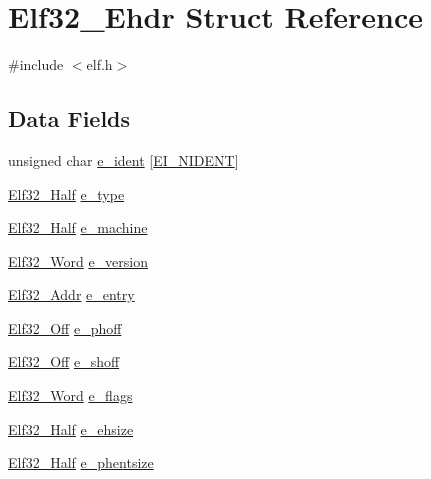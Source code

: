 \hypertarget{struct_elf32___ehdr}{\section{Elf32\-\_\-\-Ehdr Struct Reference}
\label{struct_elf32___ehdr}
}


{\ttfamily \#include $<$elf.\-h$>$}

\subsection*{Data Fields}
\begin{DoxyCompactItemize}
\item 
unsigned char \hyperlink{struct_elf32___ehdr_a989deb32d9be1514da87d64e8698600a}{e\-\_\-ident} \mbox{[}\hyperlink{elf_8h_ae407130db14180c6737390604ba7c1fe}{E\-I\-\_\-\-N\-I\-D\-E\-N\-T}\mbox{]}
\item 
\hyperlink{elf_8h_a2ff0787d7d1bae0f251192806a2974ca}{Elf32\-\_\-\-Half} \hyperlink{struct_elf32___ehdr_a7f0b549920bf4fc78b5ca36a17dc50b3}{e\-\_\-type}
\item 
\hyperlink{elf_8h_a2ff0787d7d1bae0f251192806a2974ca}{Elf32\-\_\-\-Half} \hyperlink{struct_elf32___ehdr_a334b2b2406970a5d2a0a903dd5ed5745}{e\-\_\-machine}
\item 
\hyperlink{elf_8h_af5924ece606c732e86f8263a19408e45}{Elf32\-\_\-\-Word} \hyperlink{struct_elf32___ehdr_af3c8fac8345400aef61da74b2de320c8}{e\-\_\-version}
\item 
\hyperlink{elf_8h_a40c6d4571e6001f443cc6a6474620158}{Elf32\-\_\-\-Addr} \hyperlink{struct_elf32___ehdr_a146e750d8c5ddfa36d84e83fd43a9828}{e\-\_\-entry}
\item 
\hyperlink{elf_8h_a655751f9b317369b93c581ea8ed84516}{Elf32\-\_\-\-Off} \hyperlink{struct_elf32___ehdr_ada87533ed3557b687daa8d999461c79b}{e\-\_\-phoff}
\item 
\hyperlink{elf_8h_a655751f9b317369b93c581ea8ed84516}{Elf32\-\_\-\-Off} \hyperlink{struct_elf32___ehdr_ad1cb2a7b39b5465b19922fcd2a449ee1}{e\-\_\-shoff}
\item 
\hyperlink{elf_8h_af5924ece606c732e86f8263a19408e45}{Elf32\-\_\-\-Word} \hyperlink{struct_elf32___ehdr_af4e9f6a9950c02e6378aa0e85aa8bfe3}{e\-\_\-flags}
\item 
\hyperlink{elf_8h_a2ff0787d7d1bae0f251192806a2974ca}{Elf32\-\_\-\-Half} \hyperlink{struct_elf32___ehdr_aa0fef16d9e9b4c56c6449fe6e5e43571}{e\-\_\-ehsize}
\item 
\hyperlink{elf_8h_a2ff0787d7d1bae0f251192806a2974ca}{Elf32\-\_\-\-Half} \hyperlink{struct_elf32___ehdr_ad0b31b8c5e1c550d79195f8190650caa}{e\-\_\-phentsize}

\end{DoxyCompactItemize}
